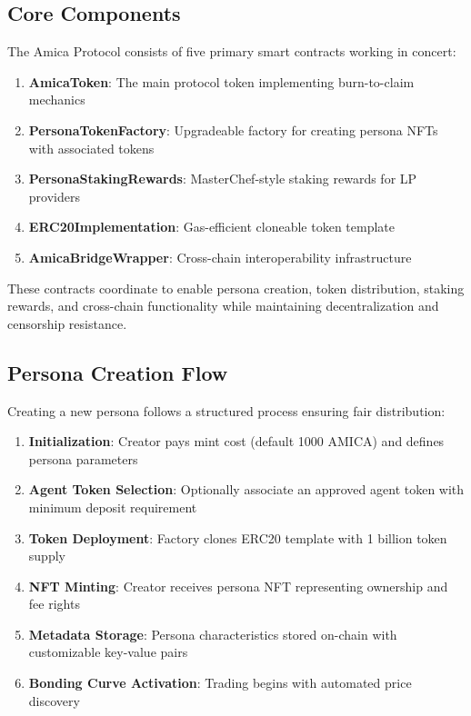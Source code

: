 \documentclass{article}
\begin{document}
\subsection{Core Components}

The Amica Protocol consists of five primary smart contracts working in concert:

\begin{enumerate}
    \item \textbf{AmicaToken}: The main protocol token implementing burn-to-claim mechanics
    \item \textbf{PersonaTokenFactory}: Upgradeable factory for creating persona NFTs with associated tokens
    \item \textbf{PersonaStakingRewards}: MasterChef-style staking rewards for LP providers
    \item \textbf{ERC20Implementation}: Gas-efficient cloneable token template
    \item \textbf{AmicaBridgeWrapper}: Cross-chain interoperability infrastructure
\end{enumerate}

These contracts coordinate to enable persona creation, token distribution, staking rewards, and cross-chain functionality while maintaining decentralization and censorship resistance.

\subsection{Persona Creation Flow}

Creating a new persona follows a structured process ensuring fair distribution:

\begin{enumerate}
    \item \textbf{Initialization}: Creator pays mint cost (default 1000 AMICA) and defines persona parameters
    \item \textbf{Agent Token Selection}: Optionally associate an approved agent token with minimum deposit requirement
    \item \textbf{Token Deployment}: Factory clones ERC20 template with 1 billion token supply
    \item \textbf{NFT Minting}: Creator receives persona NFT representing ownership and fee rights
    \item \textbf{Metadata Storage}: Persona characteristics stored on-chain with customizable key-value pairs
    \item \textbf{Bonding Curve Activation}: Trading begins with automated price discovery
\end{enumerate}
\end{document}
